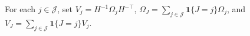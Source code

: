 For each \(j\in\mathcal J\), set \(V_j=H^{-1}\Omega_jH^{-\top}\), \(\Omega_J=\sum_{j\in\mathcal J}\mathbf 1\{J=j\}\Omega_j\), and \(V_J=\sum_{j\in\mathcal J}\mathbf 1\{J=j\}V_j\).
